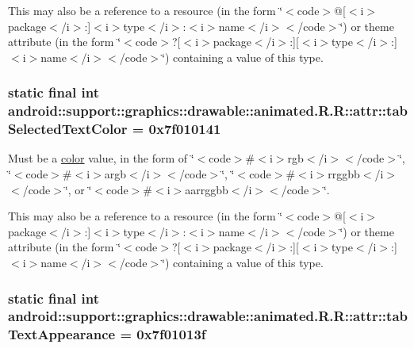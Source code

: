 This may also be a reference to a resource (in the form \char`\"{}$<$code$>$@\mbox{[}$<$i$>$package$<$/i$>$:\mbox{]}$<$i$>$type$<$/i$>$:$<$i$>$name$<$/i$>$$<$/code$>$\char`\"{}) or theme attribute (in the form \char`\"{}$<$code$>$?\mbox{[}$<$i$>$package$<$/i$>$:\mbox{]}\mbox{[}$<$i$>$type$<$/i$>$:\mbox{]}$<$i$>$name$<$/i$>$$<$/code$>$\char`\"{}) containing a value of this type. \hypertarget{classandroid_1_1support_1_1graphics_1_1drawable_1_1animated_1_1_r_1_1attr_c50ab644a6f380cd7a2ec68c86d115b4}{
\subsubsection[{tabSelectedTextColor}]{\setlength{\rightskip}{0pt plus 5cm}static final int android::support::graphics::drawable::animated.R.R::attr::tabSelectedTextColor = 0x7f010141}}
\label{classandroid_1_1support_1_1graphics_1_1drawable_1_1animated_1_1_r_1_1attr_c50ab644a6f380cd7a2ec68c86d115b4}


Must be a \hyperlink{classandroid_1_1support_1_1graphics_1_1drawable_1_1animated_1_1_r_1_1color}{color} value, in the form of \char`\"{}$<$code$>$\#$<$i$>$rgb$<$/i$>$$<$/code$>$\char`\"{}, \char`\"{}$<$code$>$\#$<$i$>$argb$<$/i$>$$<$/code$>$\char`\"{}, \char`\"{}$<$code$>$\#$<$i$>$rrggbb$<$/i$>$$<$/code$>$\char`\"{}, or \char`\"{}$<$code$>$\#$<$i$>$aarrggbb$<$/i$>$$<$/code$>$\char`\"{}. 

This may also be a reference to a resource (in the form \char`\"{}$<$code$>$@\mbox{[}$<$i$>$package$<$/i$>$:\mbox{]}$<$i$>$type$<$/i$>$:$<$i$>$name$<$/i$>$$<$/code$>$\char`\"{}) or theme attribute (in the form \char`\"{}$<$code$>$?\mbox{[}$<$i$>$package$<$/i$>$:\mbox{]}\mbox{[}$<$i$>$type$<$/i$>$:\mbox{]}$<$i$>$name$<$/i$>$$<$/code$>$\char`\"{}) containing a value of this type. \hypertarget{classandroid_1_1support_1_1graphics_1_1drawable_1_1animated_1_1_r_1_1attr_096fd306bf95811148b4b4547d9cf4d0}{
\subsubsection[{tabTextAppearance}]{\setlength{\rightskip}{0pt plus 5cm}static final int android::support::graphics::drawable::animated.R.R::attr::tabTextAppearance = 0x7f01013f}}
\label{classandroid_1_1support_1_1graphics_1_1drawable_1_1animated_1_1_r_1_1attr_096fd306bf95811148b4b4547d9cf4d0}


